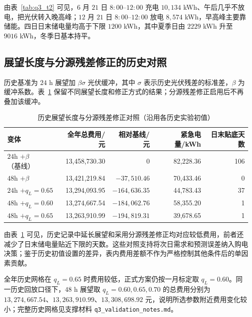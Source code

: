 由表~\ref{tab:q3_t2} 可见，$6$ 月 $21$ 日 $8{:}00$--$12{:}00$ 充电 $10{,}134$ kWh、午后几乎不放电，把光伏转入晚高峰；$12$ 月 $21$ 日 $8{:}00$--$12{:}00$ 放电 $8{,}574$ kWh，早高峰主要靠储能。四日日末储电量均高于下限 $1200$ kWh，其中夏季日由 $2229$ kWh 升至 $9016$ kWh，冬季日基本持平。

\subsection{展望长度与分源残差修正的历史对照}

历史基准为 $24$ h 展望加 $\beta\sigma$ 光伏缓冲，其中 $\sigma$ 表示历史光伏残差的标准差，$\beta$ 为缓冲系数。表~\ref{tab:q3_ablation} 保留不同展望长度和修正方式的结果；分源残差修正启用后不再叠加该缓冲。

\begin{table}[!htbp]
  \centering
  \small
  \setlength{\tabcolsep}{4.5pt}
  \caption{历史展望长度与分源残差修正对照（沿用各历史实验初值）}
  \label{tab:q3_ablation}
  \begin{tabular}{lrrrr}
    \toprule
    变体 & 全年总费用/元 & 相对基线/元 & 紧急电量/kWh & 日末贴底天数 \\
    \midrule
    $24$h $+\beta$（基线） & 13{,}458{,}730.30 & 0 & 82{,}228.36 & 106 \\
    $48$h $+\beta$ & 13{,}421{,}219.84 & $-37{,}510.46$ & 70{,}433.46 & 0 \\
    $24$h $+q_L{=}0.65$ & 13{,}294{,}093.95 & $-164{,}636.35$ & 44{,}783.43 & 37 \\
    $48$h $+q_L{=}0.60$ & 13{,}274{,}667.54 & $-184{,}062.76$ & 58{,}355.20 & 1 \\
    $48$h $+q_L{=}0.65$ & 13{,}263{,}910.99 & $-194{,}819.31$ & 39{,}678.65 & 1 \\
    \bottomrule
  \end{tabular}
\end{table}

由表~\ref{tab:q3_ablation} 可见，历史记录中延长展望和采用分源残差修正均对应较低费用，前者还减少了日末储电量贴近下限的天数。这些对照支持将次日需求和预测误差纳入购电决策；鉴于历史初值设置的差异，表内费用差额不作为严格控制其他条件后的单因素贡献。

全年历史网格在 $q_L=0.65$ 时费用较低，正式方案仍按一月标定取 $q_L=0.60$。同一历史回放口径下，$48$ h 展望取 $q_L=0.60,0.65,0.70$ 的总费用分别为 $13{,}274{,}667.54$、$13{,}263{,}910.99$、$13{,}308{,}698.92$ 元，说明所选参数附近费用变化较小；完整历史网格见支撑材料 \texttt{q3\_validation\_notes.md}。

